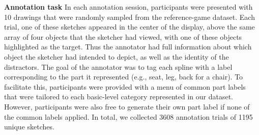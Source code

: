 \documentclass[10pt,letterpaper]{article}
\newcommand{\jefan}[1]{{\color{blue}{[jefan: #1]}}}
\begin{document}
\noindent \textbf{Annotation task} \hspace{3mm} \jefan{Would be good to put a cleaned up version of the annotation task interface around here.} In each annotation session, participants were presented with 10 drawings that were randomly sampled from the reference-game dataset. 
Each trial, one of these sketches appeared in the center of the display, above the same array of four objects that the sketcher had viewed, with one of these objects highlighted as the target. 
Thus the annotator had full information about which object the sketcher had intended to depict, as well as the identity of the distractors. 
The goal of the annotator was to tag each spline with a label corresponding to the part it represented (e.g., seat, leg, back for a chair). 
To facilitate this, participants were provided with a menu of common part labels that were tailored to each basic-level category represented in our dataset. \jefan{It would be good to have a table containing the part labels that were provided for each category.}
However, participants were also free to generate their own part label if none of the common labels applied.
In total, we collected 3608 annotation trials of 1195 unique sketches. \jefan{What happened to the other 3 drawings?}

\end{document}
